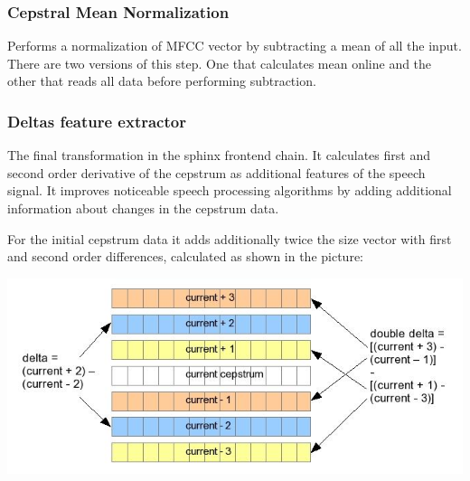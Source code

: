 \documentclass[12pt,a4paper,english]{article}
\begin{document}
\subsubsection{Cepstral Mean Normalization}

Performs a normalization of MFCC vector by subtracting a mean of all the input. There are two versions
of this step. One that calculates mean online and the other that reads all data before performing
subtraction.

\subsubsection{Deltas feature extractor}

The final transformation in the sphinx frontend chain. It calculates first and second order derivative of the
cepstrum as additional features of the speech signal. It improves noticeable speech processing algorithms
by adding additional information about changes in the cepstrum data. \newline

For the initial cepstrum data it adds additionally twice the size vector with first and second order
differences, calculated as shown in the picture:
\begin{center}
    \includegraphics[scale=0.6]{deltas_calc.jpg}
\end {center}
\end{document}
